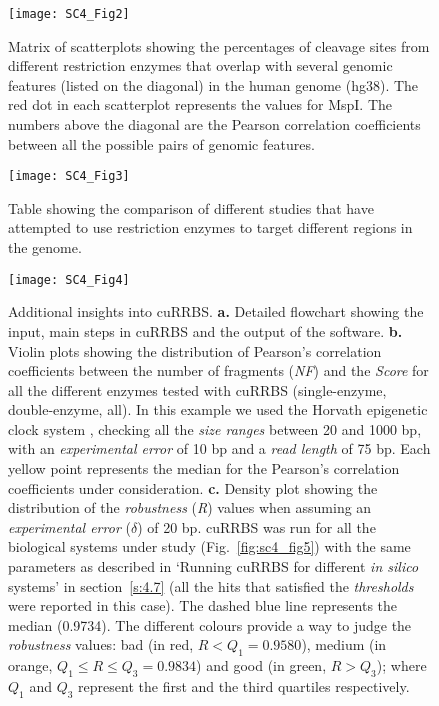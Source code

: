 \begin{figure}[htbp!] 
	\centering    
	\texttt{[image: SC4\_Fig2]}
	\caption[Genomic features that overlap with restriction enzyme cleavage sites]{Matrix of scatterplots showing the percentages of cleavage sites from different restriction enzymes that overlap with several genomic features (listed on the diagonal) in the human genome (hg38). The red dot in each scatterplot represents the values for MspI. The numbers above the diagonal are the Pearson correlation coefficients between all the possible pairs of genomic features.}
	\label{fig:sc4_fig2}
\end{figure}

\begin{figure}[htbp!] 
	\centering    
	\texttt{[image: SC4\_Fig3]}
	\caption[Comparison of studies using restriction enzymes for genomic enrichment]{Table showing the comparison of different studies that have attempted to use restriction enzymes to target different regions in the genome.}
	\label{fig:sc4_fig3}
\end{figure}

\begin{figure}[htbp!] 
	\centering    
	\texttt{[image: SC4\_Fig4]}
	\vspace*{1mm}
	\caption[Additional insights into cuRRBS]{Additional insights into cuRRBS. \textbf{a.} Detailed flowchart showing the input, main steps in cuRRBS and the output of the software. \textbf{b.} Violin plots showing the distribution of Pearson's correlation coefficients between the number of fragments (\textit{NF}) and the \textit{Score} for all the different enzymes tested with cuRRBS (single-enzyme, double-enzyme, all). In this example we used the Horvath epigenetic clock system \cite{Horvath2013}, checking all the \textit{size ranges} between 20 and 1000 bp, with an \textit{experimental error} of 10 bp and a \textit{read length} of 75 bp. Each yellow point represents the median for the Pearson's correlation coefficients under consideration. \textbf{c.} Density plot showing the distribution of the \textit{robustness} (\textit{R}) values when assuming an \textit{experimental error} ($\delta$) of 20 bp. cuRRBS was run for all the biological systems under study (Fig.~\ref{fig:sc4_fig5}) \cite{Horvath2013,Hanna2016,Milagre2017,Kawakatsu2016,Maurano2015,LevMaor2015,Domcke2015} with the same parameters as described in `Running cuRRBS for different \textit{in silico} systems' in section~\ref{s:4.7} (all the hits that satisfied the \textit{thresholds} were reported in this case). The dashed blue line represents the median (0.9734). The different colours provide a way to judge the \textit{robustness} values: bad (in red, $R < Q_1 = 0.9580$), medium (in orange, $Q_1 \leq R \leq Q_3 = 0.9834$) and good (in green, $R > Q_3$); where $Q_1$ and $Q_3$ represent the first and the third quartiles respectively.}
	\label{fig:sc4_fig4}
\end{figure}

